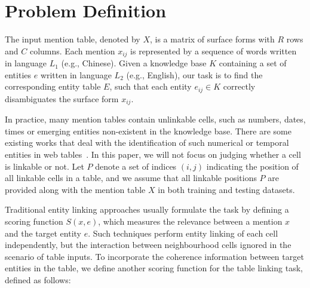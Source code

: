 \section{Problem Definition}
\label{sec:problem}


The input mention table, denoted by $X$,
is a matrix of surface forms with $R$ rows and $C$ columns.
Each mention $x_{ij}$ is represented by a sequence of words
written in language $L_1$ (e.g., Chinese).
Given a knowledge base $K$ containing a set of entities $e$ written in language $L_2$ (e.g., English),
our task is to find the corresponding entity table $E$,
such that each entity $e_{ij} \in K$ correctly disambiguates the surface form $x_{ij}$. 

In practice, many mention tables contain unlinkable cells,
such as numbers, dates, times or emerging entities non-existent in the knowledge base.
There are some existing works that deal with the identification of
such numerical or temporal entities in web tables~\cite{ibrahim2016making}. 
In this paper, we will not focus on judging whether a cell is linkable or not.
Let $P$ denote a set of indices $(i, j)$
indicating the position of all linkable cells in a table,
and we assume that all linkable positions $P$ are provided along 
with the mention table $X$ in both training and testing datasets.

Traditional entity linking approaches
usually formulate the task by defining a scoring function $S(x, e)$,
which measures the relevance between a mention $x$ and the target entity $e$.
Such techniques perform entity linking of each cell independently,
but the interaction between neighbourhood cells ignored in the scenario of table inputs.
To incorporate the coherence information between target entities in the table,
we define another scoring function for the table linking task, defined as follows:

